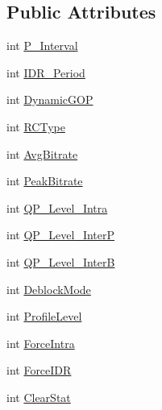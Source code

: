 \subsection*{Public Attributes}
\begin{DoxyCompactItemize}
\item 
int \hyperlink{structcv_1_1gpu_1_1VideoWriter__GPU_1_1EncoderParams_af6b2b5aaffb429643ac6fdb3a97995c9}{P\-\_\-\-Interval}
\item 
int \hyperlink{structcv_1_1gpu_1_1VideoWriter__GPU_1_1EncoderParams_a3f54de95350cd16c19eca4d94c67220b}{I\-D\-R\-\_\-\-Period}
\item 
int \hyperlink{structcv_1_1gpu_1_1VideoWriter__GPU_1_1EncoderParams_aae0defd9124971f130a87e290e1192a6}{Dynamic\-G\-O\-P}
\item 
int \hyperlink{structcv_1_1gpu_1_1VideoWriter__GPU_1_1EncoderParams_acf99e6f1c0a59c82c0dfdb7e7d09240f}{R\-C\-Type}
\item 
int \hyperlink{structcv_1_1gpu_1_1VideoWriter__GPU_1_1EncoderParams_a5657bdc4de3af96ee035224dd51b2393}{Avg\-Bitrate}
\item 
int \hyperlink{structcv_1_1gpu_1_1VideoWriter__GPU_1_1EncoderParams_a572b0afd18117efae3803ae2d8a503cd}{Peak\-Bitrate}
\item 
int \hyperlink{structcv_1_1gpu_1_1VideoWriter__GPU_1_1EncoderParams_aa2c27da41d1d6d971946ee3febfef652}{Q\-P\-\_\-\-Level\-\_\-\-Intra}
\item 
int \hyperlink{structcv_1_1gpu_1_1VideoWriter__GPU_1_1EncoderParams_a8ca625f276ae370de7acbd3e49976743}{Q\-P\-\_\-\-Level\-\_\-\-Inter\-P}
\item 
int \hyperlink{structcv_1_1gpu_1_1VideoWriter__GPU_1_1EncoderParams_a1414850923c34e0e0325944400c68cf6}{Q\-P\-\_\-\-Level\-\_\-\-Inter\-B}
\item 
int \hyperlink{structcv_1_1gpu_1_1VideoWriter__GPU_1_1EncoderParams_a712c6a083474dbb952938a79b60494da}{Deblock\-Mode}
\item 
int \hyperlink{structcv_1_1gpu_1_1VideoWriter__GPU_1_1EncoderParams_ac93bcbbd6eb30a44da3f8a47e30dbb14}{Profile\-Level}
\item 
int \hyperlink{structcv_1_1gpu_1_1VideoWriter__GPU_1_1EncoderParams_a309ba8d5e846e37b7d4c81fa33c2d8e8}{Force\-Intra}
\item 
int \hyperlink{structcv_1_1gpu_1_1VideoWriter__GPU_1_1EncoderParams_ab2b29f99a5b143efafaaf743e29a4726}{Force\-I\-D\-R}
\item 
int \hyperlink{structcv_1_1gpu_1_1VideoWriter__GPU_1_1EncoderParams_a4ef869f90a92ed5a0b8d2006be7ab8a5}{Clear\-Stat}

\end{DoxyCompactItemize}
